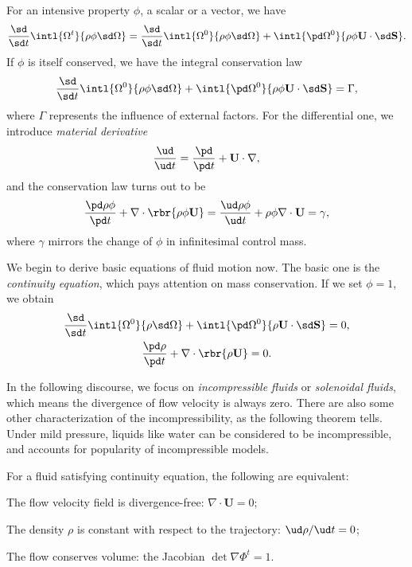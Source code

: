 \documentclass[english, nochinese]{pkupaper}
\begin{document}
For an intensive property $\phi$, a scalar or a vector, we have
\begin{equation}
\frac{\sd}{ \sd t } \intl{\Omega^t}{ \rho \phi \sd \Omega } = \frac{\sd}{ \sd t } \intl{\Omega^0}{ \rho \phi \sd \Omega } + \intl{ \pd \Omega^0 }{ \rho \phi \mathbf{U} \cdot \sd \mathbf{S} }.
\end{equation}
If $\phi$ is itself conserved, we have the integral conservation law
\begin{equation}
\frac{\sd}{ \sd t } \intl{\Omega^0}{ \rho \phi \sd \Omega } + \intl{ \pd \Omega^0 }{ \rho \phi \mathbf{U} \cdot \sd \mathbf{S} } = \Gamma,
\end{equation}
where $\Gamma$ represents the influence of external factors. For the differential one, we introduce \emph{material derivative}
\begin{equation}
\frac{\ud}{ \ud t } = \frac{\pd}{ \pd t } + \mathbf{U} \cdot \nabla,
\end{equation}
and the conservation law turns out to be
\begin{equation}
\frac{ \pd \rho \phi }{ \pd t } + \nabla \cdot \rbr{ \rho \phi \mathbf{U} } = \frac{ \ud \rho \phi }{ \ud t } + \rho \phi \nabla \cdot \mathbf{U} = \gamma,
\end{equation}
where $\gamma$ mirrors the change of $\phi$ in infinitesimal control mass.

We begin to derive basic equations of fluid motion now. The basic one is the \emph{continuity equation}, which pays attention on mass conservation. If we set $ \phi = 1 $, we obtain
\begin{gather}
\frac{\sd}{ \sd t } \intl{\Omega^0}{ \rho \sd \Omega } + \intl{ \pd \Omega^0 }{ \rho \mathbf{U} \cdot \sd \mathbf{S} } = 0, \\
\frac{ \pd \rho }{ \pd t } + \nabla \cdot \rbr{ \rho \mathbf{U} } = 0.
\end{gather}

In the following discourse, we focus on \emph{incompressible fluids} or \emph{solenoidal fluids}, which means the divergence of flow velocity is always zero. There are also some other characterization of the incompressibility, as the following theorem tells. Under mild pressure, liquids like water can be considered to be incompressible, and accounts for popularity of incompressible models. 

\begin{thmtheorem}
For a fluid satisfying continuity equation, the following are equivalent:
\begin{partlist}
\item The flow velocity field is divergence-free: $ \nabla \cdot \mathbf{U} = 0 $;
\item The density $\rho$ is constant with respect to the trajectory: $ \ud \rho / \ud t = 0 $;
\item The flow conserves volume: the Jacobian $ \det \nabla \Phi^t = 1 $.
\end{partlist}
\end{thmtheorem}
\end{document}
